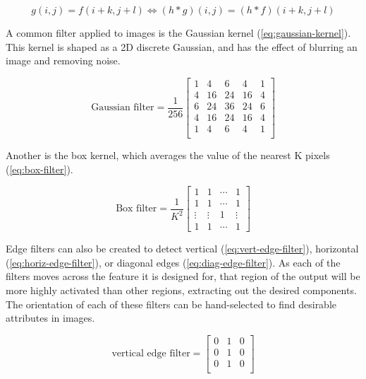 \begin{equation}
    g(i,j) = f(i+k,j+l) \Longleftrightarrow (h*g)(i,j) = (h*f)(i+k,j+l)
    \label{eq:shift-invariance}
\end{equation}

A common filter applied to images is the Gaussian kernel (\cref{eq:gaussian-kernel}).
This kernel is shaped as a 2D discrete Gaussian, and has the effect of blurring an image and removing noise.

\begin{equation}
    \text{Gaussian filter}=\frac{1}{256}\begin{bmatrix}
        1 & 4 & 6 & 4 & 1 \\
        4 & 16 & 24 & 16 & 4\\
        6 & 24 & 36 & 24 & 6\\
        4 & 16 & 24 & 16 & 4\\
        1 & 4 & 6 & 4 & 1 \\
    \end{bmatrix}
    \label{eq:gaussian-kernel}
\end{equation}

Another is the box kernel, which averages the value of the nearest K pixels (\cref{eq:box-filter}).

\begin{equation}
    \text{Box filter} = \frac{1}{K^{2}}\begin{bmatrix}
        1 & 1 & \cdots &1\\
        1 & 1 & \cdots &1 \\
        \vdots & \vdots & 1 & \vdots \\
        1 & 1 & \cdots & 1
    \end{bmatrix}
    \label{eq:box-filter}
\end{equation}

Edge filters can also be created to detect vertical (\cref{eq:vert-edge-filter}), horizontal (\cref{eq:horiz-edge-filter}), or diagonal edges (\cref{eq:diag-edge-filter}).
As each of the filters moves across the feature it is designed for, that region of the output will be more highly activated than other regions, extracting out the desired components.
The orientation of each of these filters can be hand-selected to find desirable attributes in images.

\begin{equation}
    \text{vertical edge filter} = \begin{bmatrix}
            0 & 1 & 0 \\
            0 & 1 & 0 \\
            0 & 1 & 0 \\
    \end{bmatrix}
    \label{eq:vert-edge-filter}
\end{equation}

